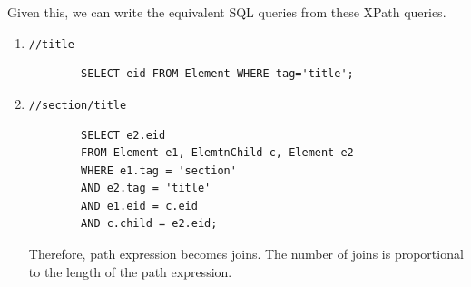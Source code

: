   Given this, we can write the equivalent SQL queries from these XPath queries. 
  \begin{enumerate}
    \item \texttt{//title} 
      \begin{lstlisting}
        SELECT eid FROM Element WHERE tag='title';
      \end{lstlisting}

    \item \texttt{//section/title} 
      \begin{lstlisting}
        SELECT e2.eid 
        FROM Element e1, ElemtnChild c, Element e2 
        WHERE e1.tag = 'section' 
        AND e2.tag = 'title' 
        AND e1.eid = c.eid 
        AND c.child = e2.eid;
      \end{lstlisting}
      Therefore, path expression becomes joins. The number of joins is proportional to the length of the path expression. 
  \end{enumerate}

